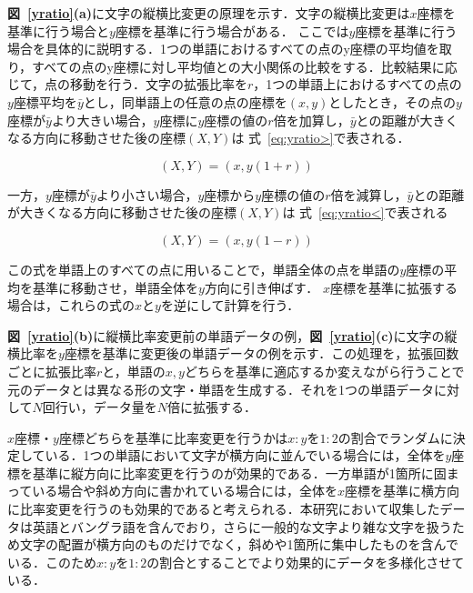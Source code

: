 \textbf{図~\ref{yratio}(a)}に文字の縦横比変更の原理を示す．文字の縦横比変更は$x$座標を基準に行う場合と$y$座標を基準に行う場合がある．
ここでは$y$座標を基準に行う場合を具体的に説明する．1つの単語におけるすべての点のy座標の平均値を取り，すべての点のy座標に対し平均値との大小関係の比較をする．比較結果に応じて，点の移動を行う．文字の拡張比率を$r$，1つの単語上におけるすべての点の$y$座標平均を$\bar{y}$とし，同単語上の任意の点の座標を$(x, y)$としたとき，その点の$y$座標が$\bar{y}$より大きい場合，$y$座標に$y$座標の値の$r$倍を加算し，$\bar{y}$との距離が大きくなる方向に移動させた後の座標$(X, Y)$は 式~\ref{eq:yratio>}で表される．

\begin{equation}
  (X, Y) = (x, y(1+r))
  \label{eq:yratio>}
\end{equation}

一方，$y$座標が$\bar{y}$より小さい場合，$y$座標から$y$座標の値の$r$倍を減算し，$\bar{y}$との距離が大きくなる方向に移動させた後の座標$(X, Y)$は 式~\ref{eq:yratio<}で表される

\begin{equation}
  (X, Y) = (x, y(1-r))
  \label{eq:yratio<}
\end{equation}

この式を単語上のすべての点に用いることで，単語全体の点を単語の$y$座標の平均を基準に移動させ，単語全体を$y$方向に引き伸ばす．
$x$座標を基準に拡張する場合は，これらの式の$x$と$y$を逆にして計算を行う．


\textbf{図~\ref{yratio}(b)}に縦横比率変更前の単語データの例，\textbf{図~\ref{yratio}(c)}に文字の縦横比率を$y$座標を基準に変更後の単語データの例を示す．この処理を，拡張回数ごとに拡張比率$r$と，単語の$x,y$どちらを基準に適応するか変えながら行うことで元のデータとは異なる形の文字・単語を生成する．それを1つの単語データに対して$N$回行い，データ量を$N$倍に拡張する．

$x$座標・$y$座標どちらを基準に比率変更を行うかは$x:y$を$1:2$の割合でランダムに決定している．1つの単語において文字が横方向に並んでいる場合には，全体を$y$座標を基準に縦方向に比率変更を行うのが効果的である．一方単語が1箇所に固まっている場合や斜め方向に書かれている場合には，全体を$x$座標を基準に横方向に比率変更を行うのも効果的であると考えられる．本研究において収集したデータは英語とバングラ語を含んでおり，さらに一般的な文字より雑な文字を扱うため文字の配置が横方向のものだけでなく，斜めや1箇所に集中したものを含んでいる．このため$x:y$を$1:2$の割合とすることでより効果的にデータを多様化させている．

